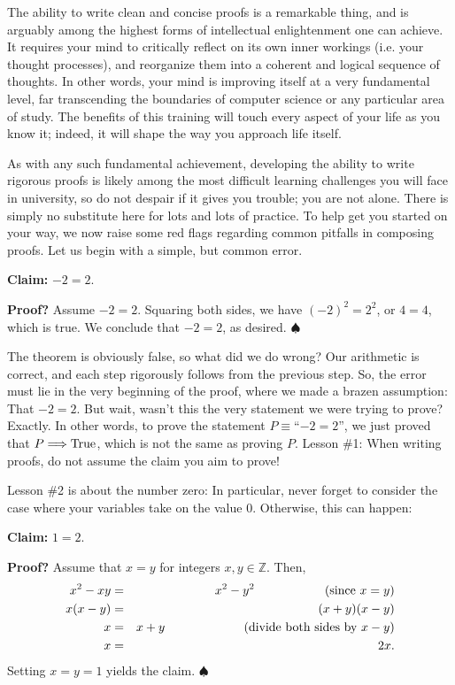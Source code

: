 \documentclass[11pt]{article}
\newcounter{thm}
\begin{document}
The ability to write clean and concise proofs is a remarkable thing, and is arguably among the highest forms of intellectual enlightenment one can achieve. It requires your mind to critically reflect on its own inner workings (i.e. your thought processes), and reorganize them into a coherent and logical sequence of thoughts. In other words, your mind is improving itself at a very fundamental level, far transcending the boundaries of computer science or any particular area of study. The benefits of this training will touch every aspect of your life as you know it; indeed, it will shape the way you approach life itself.

As with any such fundamental achievement, developing the ability to write rigorous proofs is likely among the most difficult learning challenges you will face in university, so do not despair if it gives you trouble; you are not alone. There is simply no substitute here for lots and lots of practice. To help get you started on your way, we now raise some red flags regarding common pitfalls in composing proofs. Let us begin with a simple, but common error.

\textbf{Claim:} $-2 = 2$.

\textbf{Proof?} Assume $-2 = 2$. Squaring both sides, we have $(-2)^2 = 2^2$, or $4 = 4$, which is true. We conclude that $-2 = 2$, as desired. $\spadesuit$

The theorem is obviously false, so what did we do wrong? Our arithmetic is correct, and each step rigorously follows from the previous step. So, the error must lie in the very beginning of the proof, where we made a brazen assumption: That $-2=2$. But wait, wasn't this the very statement we were trying to prove? Exactly. In other words, to prove the statement $P\equiv$``$-2=2$'', we just proved that $P\Longrightarrow\text{True}$, which is not the same as proving $P$. Lesson \#1: When writing proofs, do not assume the claim you aim to prove!

Lesson \#2 is about the number zero: In particular, never forget to consider the case where your variables take on the value $0$. Otherwise, this can happen:

\textbf{Claim:} $1 = 2$.

\textbf{Proof?} Assume that $x=y$ for integers $x,y\in\mathbb{Z}$. Then,
\begin{eqnarray*}
    x^2-xy &=& x^2-y^2 \text{\hspace{20mm}(since $x=y$)}\\
    x(x-y) &=& (x+y)(x-y)\\
    x &=& x+y \quad\text{\hspace{19mm}(divide both sides by $x-y$)}\\
    x &=& 2x.
\end{eqnarray*}
Setting $x=y=1$ yields the claim.
$\spadesuit$
\end{document}
